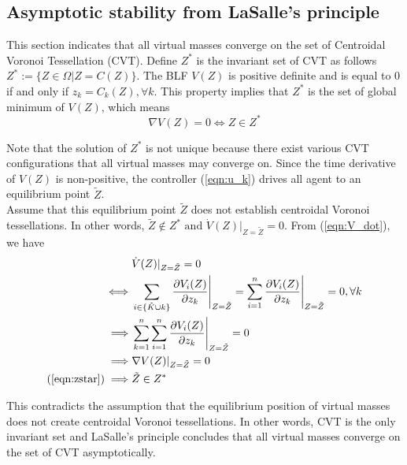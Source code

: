 \documentclass[journal]{IEEEtran}
\begin{document}
	{\color{red}
		\subsection{Asymptotic stability from LaSalle's principle}
		This section indicates that all virtual masses converge on the set of Centroidal Voronoi Tessellation (CVT). Define $Z^*$ is the invariant set of CVT as follows $Z^* := \{Z \in \Omega | Z = C(Z) \}$. The BLF $V(Z)$ is positive definite and is equal to $0$ if and only if $z_k = C_k(Z), \forall k$. This property implies that $Z^*$ is the set of global minimum of $V(Z)$, which means
		\begin{equation} \label{eqn:zstar}
		\nabla V(Z) = 0 \iff Z \in Z^* 
		\end{equation}
		
		Note that the solution of $Z^*$ is not unique because there exist various CVT configurations that all virtual masses may converge on. Since the time derivative of $V(Z)$ is non-positive, the controller (\ref{eqn:u_k}) drives all agent to an equilibrium point $\tilde{Z}$. \\
		Assume that this equilibrium point $\tilde{Z}$ does not establish centroidal Voronoi tessellations. In other words, $\tilde{Z} \notin Z^* \text{ and } \dot{V}(Z)|_{Z = \tilde{Z}} = 0 $. From (\ref{eqn:V_dot}), we have
		\begin{equation} \notag
		\begin{split}
		& \dot{V}(Z)|_{Z = \tilde{Z}} = 0  \\
		\iff & \sum\limits_{i \in \{\tilde{K} \cup k\}}\frac{\partial V_i(Z)}{\partial z_k}\Bigg|_{Z = \tilde{Z}} = \sum^n_{i = 1}\frac{\partial V_i(Z)}{\partial z_k}\Bigg|_{Z = \tilde{Z}} = 0, \forall{k} \\
		\implies & \sum^n_{k = 1}\sum^n_{i = 1}\frac{\partial V_i(Z)}{\partial z_k}\Bigg|_{Z = \tilde{Z}} = 0 \\
		\implies & \nabla V(Z)|_{Z = \tilde{Z}} = 0  \\
		(\ref{eqn:zstar}) \implies & \tilde{Z} \in Z^* 
		\end{split}
		\end{equation}
		
		This contradicts the assumption that the equilibrium position of virtual masses does not create  centroidal Voronoi tessellations. In other words, CVT is the only invariant set and LaSalle's principle concludes that all virtual masses converge on the set of CVT asymptotically. }
	
\end{document}
